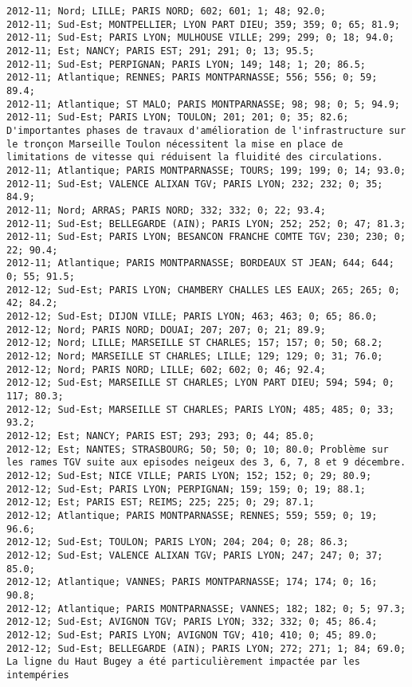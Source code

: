 \documentclass{article}
\begin{document}
\begin{Verbatim}[commandchars=\\\{\}]
2012-11; Nord; LILLE; PARIS NORD; 602; 601; 1; 48; 92.0; 
2012-11; Sud-Est; MONTPELLIER; LYON PART DIEU; 359; 359; 0; 65; 81.9; 
2012-11; Sud-Est; PARIS LYON; MULHOUSE VILLE; 299; 299; 0; 18; 94.0; 
2012-11; Est; NANCY; PARIS EST; 291; 291; 0; 13; 95.5; 
2012-11; Sud-Est; PERPIGNAN; PARIS LYON; 149; 148; 1; 20; 86.5; 
2012-11; Atlantique; RENNES; PARIS MONTPARNASSE; 556; 556; 0; 59; 89.4; 
2012-11; Atlantique; ST MALO; PARIS MONTPARNASSE; 98; 98; 0; 5; 94.9; 
2012-11; Sud-Est; PARIS LYON; TOULON; 201; 201; 0; 35; 82.6; D'importantes phases de travaux d'amélioration de l'infrastructure sur le tronçon Marseille Toulon nécessitent la mise en place de limitations de vitesse qui réduisent la fluidité des circulations.
2012-11; Atlantique; PARIS MONTPARNASSE; TOURS; 199; 199; 0; 14; 93.0; 
2012-11; Sud-Est; VALENCE ALIXAN TGV; PARIS LYON; 232; 232; 0; 35; 84.9; 
2012-11; Nord; ARRAS; PARIS NORD; 332; 332; 0; 22; 93.4; 
2012-11; Sud-Est; BELLEGARDE (AIN); PARIS LYON; 252; 252; 0; 47; 81.3; 
2012-11; Sud-Est; PARIS LYON; BESANCON FRANCHE COMTE TGV; 230; 230; 0; 22; 90.4; 
2012-11; Atlantique; PARIS MONTPARNASSE; BORDEAUX ST JEAN; 644; 644; 0; 55; 91.5; 
2012-12; Sud-Est; PARIS LYON; CHAMBERY CHALLES LES EAUX; 265; 265; 0; 42; 84.2; 
2012-12; Sud-Est; DIJON VILLE; PARIS LYON; 463; 463; 0; 65; 86.0; 
2012-12; Nord; PARIS NORD; DOUAI; 207; 207; 0; 21; 89.9; 
2012-12; Nord; LILLE; MARSEILLE ST CHARLES; 157; 157; 0; 50; 68.2; 
2012-12; Nord; MARSEILLE ST CHARLES; LILLE; 129; 129; 0; 31; 76.0; 
2012-12; Nord; PARIS NORD; LILLE; 602; 602; 0; 46; 92.4; 
2012-12; Sud-Est; MARSEILLE ST CHARLES; LYON PART DIEU; 594; 594; 0; 117; 80.3; 
2012-12; Sud-Est; MARSEILLE ST CHARLES; PARIS LYON; 485; 485; 0; 33; 93.2; 
2012-12; Est; NANCY; PARIS EST; 293; 293; 0; 44; 85.0; 
2012-12; Est; NANTES; STRASBOURG; 50; 50; 0; 10; 80.0; Problème sur les rames TGV suite aux episodes neigeux des 3, 6, 7, 8 et 9 décembre.
2012-12; Sud-Est; NICE VILLE; PARIS LYON; 152; 152; 0; 29; 80.9; 
2012-12; Sud-Est; PARIS LYON; PERPIGNAN; 159; 159; 0; 19; 88.1; 
2012-12; Est; PARIS EST; REIMS; 225; 225; 0; 29; 87.1; 
2012-12; Atlantique; PARIS MONTPARNASSE; RENNES; 559; 559; 0; 19; 96.6; 
2012-12; Sud-Est; TOULON; PARIS LYON; 204; 204; 0; 28; 86.3; 
2012-12; Sud-Est; VALENCE ALIXAN TGV; PARIS LYON; 247; 247; 0; 37; 85.0; 
2012-12; Atlantique; VANNES; PARIS MONTPARNASSE; 174; 174; 0; 16; 90.8; 
2012-12; Atlantique; PARIS MONTPARNASSE; VANNES; 182; 182; 0; 5; 97.3; 
2012-12; Sud-Est; AVIGNON TGV; PARIS LYON; 332; 332; 0; 45; 86.4; 
2012-12; Sud-Est; PARIS LYON; AVIGNON TGV; 410; 410; 0; 45; 89.0; 
2012-12; Sud-Est; BELLEGARDE (AIN); PARIS LYON; 272; 271; 1; 84; 69.0; La ligne du Haut Bugey a été particulièrement impactée par les intempéries

\end{Verbatim}
\end{document}
